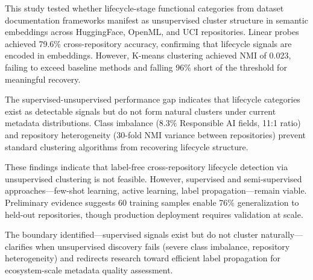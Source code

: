 
This study tested whether lifecycle-stage functional categories from dataset documentation frameworks manifest as unsupervised cluster structure in semantic embeddings across HuggingFace, OpenML, and UCI repositories. Linear probes achieved 79.6\% cross-repository accuracy, confirming that lifecycle signals are encoded in embeddings. However, K-means clustering achieved NMI of 0.023, failing to exceed baseline methods and falling 96\% short of the threshold for meaningful recovery.

The supervised-unsupervised performance gap indicates that lifecycle categories exist as detectable signals but do not form natural clusters under current metadata distributions. Class imbalance (8.3\% Responsible AI fields, 11:1 ratio) and repository heterogeneity (30-fold NMI variance between repositories) prevent standard clustering algorithms from recovering lifecycle structure.

These findings indicate that label-free cross-repository lifecycle detection via unsupervised clustering is not feasible. However, supervised and semi-supervised approaches---few-shot learning, active learning, label propagation---remain viable. Preliminary evidence suggests 60 training samples enable 76\% generalization to held-out repositories, though production deployment requires validation at scale.

The boundary identified---supervised signals exist but do not cluster naturally---clarifies when unsupervised discovery fails (severe class imbalance, repository heterogeneity) and redirects research toward efficient label propagation for ecosystem-scale metadata quality assessment.

